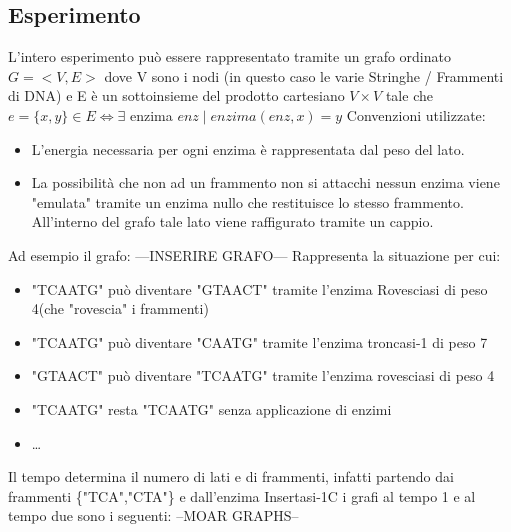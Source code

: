 \documentclass[a4paper,10pt]{article}
\begin{document}
\subsection{Esperimento}
L'intero esperimento può essere rappresentato tramite un grafo ordinato $G=<V,E>$ dove V sono i nodi (in questo caso le varie Stringhe / Frammenti di DNA) e E è un sottoinsieme del prodotto cartesiano $V\times V$ tale che $e = \{x,y\} \in E \iff \exists$ enzima $enz \mid enzima(enz,x)=y$
Convenzioni utilizzate: \begin{itemize}
\item L'energia necessaria per ogni enzima è rappresentata dal peso del lato. \item La possibilità che non ad un frammento non si attacchi nessun enzima viene "emulata" tramite un enzima nullo che restituisce lo stesso frammento. All'interno del grafo tale lato viene raffigurato tramite un cappio.

\end{itemize}
Ad esempio il grafo: ---INSERIRE GRAFO---
Rappresenta la situazione per cui:
\begin{itemize}\item "TCAATG" può diventare "GTAACT" tramite l'enzima Rovesciasi di peso 4(che "rovescia" i frammenti) \item "TCAATG" può diventare "CAATG" tramite l'enzima troncasi-1 di peso 7
\item "GTAACT" può diventare "TCAATG" tramite l'enzima rovesciasi di peso 4
\item "TCAATG" resta "TCAATG" senza applicazione di enzimi
\item \dots
\end{itemize}
Il tempo determina il numero di lati e di frammenti, infatti partendo dai frammenti \{"TCA","CTA"\} e dall'enzima Insertasi-1C i grafi al tempo 1 e al tempo due sono i seguenti:
--MOAR GRAPHS--
\end{document}
